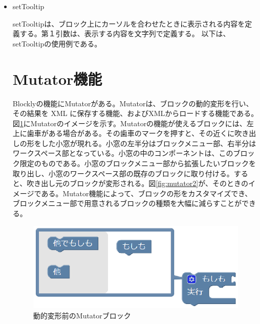 \documentclass{risepaper}
\begin{document}
\begin{itemize}

\item setTooltip

setTooltipは、ブロック上にカーソルを合わせたときに表示される内容を定義する。第１引数は、表示する内容を文字列で定義する。
以下は、setTooltipの使用例である。


   \section{Mutator機能}
   
Blocklyの機能にMutatorがある。Mutatorは、ブロックの動的変形を行い、その結果を XML に保存する機能、およびXMLからロードする機能である。図\ref{fig:mutator1}にMutatorのイメージを示す。Mutatorの機能が使えるブロックには、左上に歯車がある場合がある。その歯車のマークを押すと、その近くに吹き出しの形をした小窓が現れる。小窓の左半分はブロックメニュー部、右半分はワークスペース部となっている。小窓の中のコンポーネントは、このブロック限定のものである。小窓のブロックメニュー部から拡張したいブロックを取り出し、小窓のワークスペース部の既存のブロックに取り付ける。すると、吹き出し元のブロックが変形される。図\ref{fig:mutator2}が、そのときのイメージである。Mutator機能によって、ブロックの形をカスタマイズでき、ブロックメニュー部で用意されるブロックの種類を大幅に減らすことができる。

\begin{figure}[h]
\begin{center}
\includegraphics[scale=0.5]{img/mutator1.eps}
\caption{動的変形前のMutatorブロック}%
\label{fig:mutator1}
\end{center}%
\end{figure}%


\end{itemize}
\end{document}
